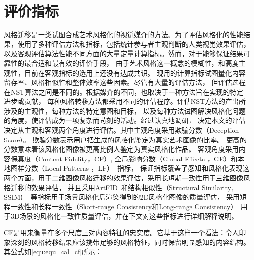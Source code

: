 \section{评价指标}
风格迁移是一类试图合成艺术风格化的视觉媒介的方法。为了评估风格化的性能结果，使用了多种评估方法和指标，包括统计参与者主观判断的人类视觉效果评估，
以及客观评估算法性能不同方面的大量定量计算指标。然而，对于能够保证结果可靠性的最合适和最有效的评价手段，
由于艺术风格这一概念的模糊性，和高度主观性，目前在客观指标的选用上还没有达成共识。
现用的计算指标试图量化内容留存率、风格相似性和整体效率这些因素。尽管有大量的评估方法，
但评估过程在NST算法之间是不同的。根据媒介的不同，也取决于一种方法旨在实现的特定进步或贡献，
每种风格转移方法都采用不同的评估程序。评估NST方法的产出所涉及的主观性，每种方法的特定意图和目标，
以及每种方法试图解决风格化问题的角度，使评估成为一项复杂而苛刻的活动。经过认真地调研，
决定本文的评估决定从主观和客观两个角度进行评估。其中主观角度采用欺骗分数（Deception Score）。
欺骗分数表示用户把生成的风格化鉴定为真实艺术图像的比率。
更高的分数意味着该风格化图像被更高比例人鉴定为真实风格化作品。
客观角度采用内容保真度（Content Fidelity，CF）, 全局影响分数（Global Effects ，GE）和本地图样分数（Local Patterns ，LP）~\cite{wang2021evaluate}指标，
保证指标覆盖了感知和风格化表现这两个方面，用于二维图像风格迁移的效果评估，采用长短期一致性用于三维图像风格迁移的效果评估，
并且采用ArtFID~\cite{wright2022artfid}和结构相似性（Structural Similarity，SSIM）~\cite{wang2004image}等指标用于场景风格化后渲染得到的2D风格化图像的质量评估，
采用短程一致性和长程一致性（Short-range Consistency和Long-range Consistency）~\cite{lai2018learning}用于3D场景的风格化一致性质量评估，并在下文对这些指标进行详细解释说明。
\par CF是用来衡量在多个尺度上对内容特征的忠实度。它基于这样一个看法：令人印象深刻的风格转移结果应该携带足够的风格特征，同时保留明显感知的内容结构。其公式如\autoref{equ:equ_cal_cf}所示：

